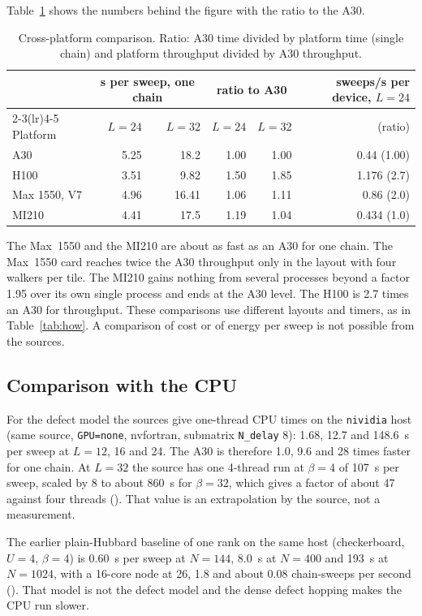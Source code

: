 Table~\ref{tab:cross} shows the numbers behind the figure with the ratio to the A30.

\begin{table}[h]
\centering
\caption{Cross-platform comparison. Ratio: A30 time divided by platform time (single chain) and platform throughput divided by A30 throughput.}
\label{tab:cross}
\small
\begin{tabular}{@{}lrrrrr@{}}
\toprule
 & \multicolumn{2}{c}{s per sweep, one chain} & \multicolumn{2}{c}{ratio to A30} & sweeps/s per device, $L=24$ \\
\cmidrule(lr){2-3}\cmidrule(lr){4-5}
Platform & $L=24$ & $L=32$ & $L=24$ & $L=32$ & (ratio) \\
\midrule
A30 & 5.25 & 18.2 & 1.00 & 1.00 & 0.44 (1.00) \\ %
H100 & 3.51 & 9.82 & 1.50 & 1.85 & 1.176 (2.7) \\ %
Max 1550, V7 & 4.96 & 16.41 & 1.06 & 1.11 & 0.86 (2.0) \\ %
MI210 & 4.41 & 17.5 & 1.19 & 1.04 & 0.434 (1.0) \\ %
\bottomrule
\end{tabular}
\end{table}

The Max~1550 and the MI210 are about as fast as an A30 for one chain. The Max~1550 card reaches twice the A30 throughput only in the layout with four walkers per tile. The MI210 gains nothing from several processes beyond a factor 1.95 over its own single process and ends at the A30 level. The H100 is 2.7 times an A30 for throughput. These comparisons use different layouts and timers, as in Table~\ref{tab:how}. A comparison of cost or of energy per sweep is not possible from the sources. 

\subsection{Comparison with the CPU}

For the defect model the sources give one-thread CPU times on the \texttt{nividia} host (same source, \texttt{GPU=none}, nvfortran, submatrix \texttt{N\_delay} 8): 1.68, 12.7 and 148.6~s per sweep at $L=12$, 16 and 24. The A30 is therefore 1.0, 9.6 and 28 times faster for one chain. At $L=32$ the source has one 4-thread run at $\beta=4$ of 107~s per sweep, scaled by 8 to about 860~s for $\beta=32$, which gives a factor of about 47 against four threads (). That value is an extrapolation by the source, not a measurement.

The earlier plain-Hubbard baseline of one rank on the same host (checkerboard, $U=4$, $\beta=4$) is 0.60~s per sweep at $N=144$, 8.0~s at $N=400$ and 193~s at $N=1024$, with a 16-core node at 26, 1.8 and about 0.08 chain-sweeps per second (). That model is not the defect model and the dense defect hopping makes the CPU run slower. 
